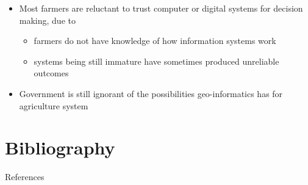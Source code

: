 \documentclass[11pt,dvipsnames,ignorenonframetext,aspectratio=169]{beamer}
\providecommand{\tightlist}{%
  \setlength{\itemsep}{0pt}\setlength{\parskip}{0pt}}
\begin{document}
\begin{frame}{}
\protect\hypertarget{section-9}{}
\begin{itemize}
\tightlist
\item
  Most farmers are reluctant to trust computer or digital systems for
  decision making, due to

  \begin{itemize}
  \tightlist
  \item
    farmers do not have knowledge of how information systems work
  \item
    systems being still immature have sometimes produced unreliable
    outcomes
  \end{itemize}
\item
  Government is still ignorant of the possibilities geo-informatics has
  for agriculture system
\end{itemize}
\end{frame}

\hypertarget{bibliography}{%
\section{Bibliography}\label{bibliography}}

\begin{frame}{References}
\protect\hypertarget{references}{}
\end{frame}
\end{document}
